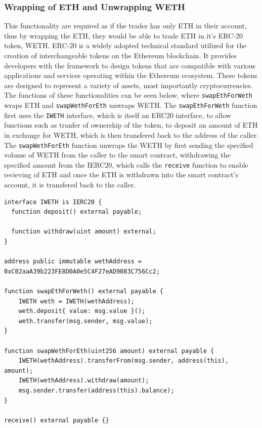 \subsubsection{Wrapping of ETH and Unwrapping WETH}
This functionality are required as if the trader has only ETH in their account, thus by wrapping the ETH, they would be able to trade ETH in it's ERC-20 token, WETH. ERC-20 is a widely adopted technical standard utilized for the creation of interchangeable tokens on the Ethereum blockchain. It provides developers with the framework to design tokens that are compatible with various applications and services operating within the Ethereum ecosystem. These tokens are designed to represent a variety of assets, most importantly cryptocurrencies. The functions of these functionalities can be seen below, where \texttt{swapEthForWeth} wraps ETH and \texttt{swapWethForEth} unwraps WETH. The \texttt{swapEthForWeth} function first uses the \texttt{IWETH} interface, which is itself an ERC20 interface, to allow functions such as tranfer of ownership of the token, to deposit an amount of ETH in exchange for WETH, which is then transfered back to the address of the caller. The \texttt{swapWethForEth} function unwraps the WETH by first sending the specified volume of WETH from the caller to the smart contract, withdrawing the specified amount from the IERC20, which calls the \texttt{receive} function to enable recieving of ETH and once the ETH is withdrawn into the smart contract's account, it is transfered back to the caller.
\begin{lstlisting}
interface IWETH is IERC20 {
  function deposit() external payable;

  function withdraw(uint amount) external;
}

address public immutable wethAddress = 0xC02aaA39b223FE8D0A0e5C4F27eAD9083C756Cc2;

function swapEthForWeth() external payable {
    IWETH weth = IWETH(wethAddress);
    weth.deposit{ value: msg.value }();
    weth.transfer(msg.sender, msg.value);
}

function swapWethForEth(uint256 amount) external payable {
    IWETH(wethAddress).transferFrom(msg.sender, address(this), amount);
    IWETH(wethAddress).withdraw(amount);
    msg.sender.transfer(address(this).balance);
}

receive() external payable {}
\end{lstlisting}

